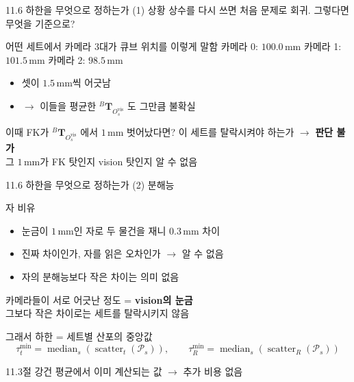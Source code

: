 \documentclass[aspectratio=169,11pt]{beamer}
\newcommand{\T}[3][]{{}^{#2}\mathbf{T}^{#1}_{#3}}   %
\newcommand{\Ovis}{O^{\mathrm{vis}}}   %
\begin{document}
\begin{frame}{11.6 하한을 무엇으로 정하는가 (1) 상황}
  상수를 다시 쓰면 처음 문제로 회귀. 그렇다면 무엇을 기준으로?
  \vfill
  \begin{block}{어떤 세트에서 카메라 3대가 큐브 위치를 이렇게 말함}
    \centering
    카메라 0: $100.0\,\mathrm{mm}$ \qquad
    카메라 1: $101.5\,\mathrm{mm}$ \qquad
    카메라 2: $98.5\,\mathrm{mm}$
  \end{block}
  \vfill
  \begin{itemize}
    \item 셋이 $1.5\,\mathrm{mm}$씩 어긋남
    \item $\rightarrow$ 이들을 평균한 $\T{B}{\Ovis_s}$ 도 그만큼 불확실
  \end{itemize}
  \vfill
  \begin{alertblock}{이때 FK가 $\T{B}{\Ovis_s}$ 에서 $1\,\mathrm{mm}$ 벗어났다면?}
    이 세트를 탈락시켜야 하는가 $\rightarrow$ \textbf{판단 불가}\\
    그 $1\,\mathrm{mm}$가 FK 탓인지 vision 탓인지 알 수 없음
  \end{alertblock}
\end{frame}

\begin{frame}{11.6 하한을 무엇으로 정하는가 (2) 분해능}
  \begin{block}{자 비유}
    \begin{itemize}
      \item 눈금이 $1\,\mathrm{mm}$인 자로 두 물건을 재니 $0.3\,\mathrm{mm}$ 차이
      \item 진짜 차이인가, 자를 읽은 오차인가 $\rightarrow$ 알 수 없음
      \item 자의 분해능보다 작은 차이는 의미 없음
    \end{itemize}
  \end{block}
  \vfill
  카메라들이 서로 어긋난 정도 = \textbf{vision의 눈금}\\
  그보다 작은 차이로는 세트를 탈락시키지 않음
  \vfill
  \begin{block}{그래서 하한 = 세트별 산포의 중앙값}
    \[
      \tau^{\min}_t
      =
      \operatorname{median}_s
      \left(\operatorname{scatter}_t(\mathcal{P}_s)\right),
      \qquad
      \tau^{\min}_R
      =
      \operatorname{median}_s
      \left(\operatorname{scatter}_R(\mathcal{P}_s)\right)
    \]
  \end{block}
  \vfill
  \centering 11.3절 강건 평균에서 이미 계산되는 값 $\rightarrow$ 추가 비용 없음
\end{frame}
\end{document}
